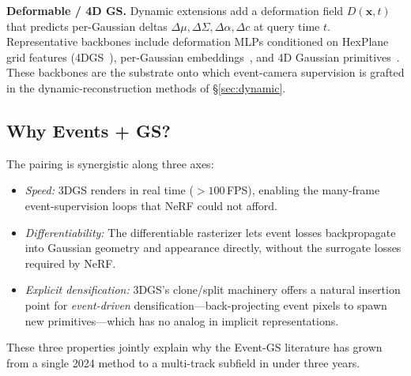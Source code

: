 \textbf{Deformable / 4D GS.} Dynamic extensions add a deformation field $D(\mathbf{x},t)$ that predicts per-Gaussian deltas $\Delta\mu,\Delta\Sigma,\Delta\alpha,\Delta c$ at query time $t$. Representative backbones include deformation MLPs conditioned on HexPlane~\cite{cao2023hexplane} grid features (4DGS~\cite{wu2024ldgswu}), per-Gaussian embeddings~\cite{bae2024pergaussian}, and 4D Gaussian primitives~\cite{yang2024realtime}. These backbones are the substrate onto which event-camera supervision is grafted in the dynamic-reconstruction methods of \S\ref{sec:dynamic}.

\subsection{Why Events + GS?}
\label{sec:bg:why}

The pairing is synergistic along three axes:
\begin{itemize}
    \item \emph{Speed:} 3DGS renders in real time ($>100$\,FPS), enabling the many-frame event-supervision loops that NeRF could not afford.
    \item \emph{Differentiability:} The differentiable rasterizer lets event losses backpropagate into Gaussian geometry and appearance directly, without the surrogate losses required by NeRF.
    \item \emph{Explicit densification:} 3DGS's clone/split machinery offers a natural insertion point for \emph{event-driven} densification---back-projecting event pixels to spawn new primitives---which has no analog in implicit representations.
\end{itemize}
These three properties jointly explain why the Event-GS literature has grown from a single 2024 method to a multi-track subfield in under three years.
